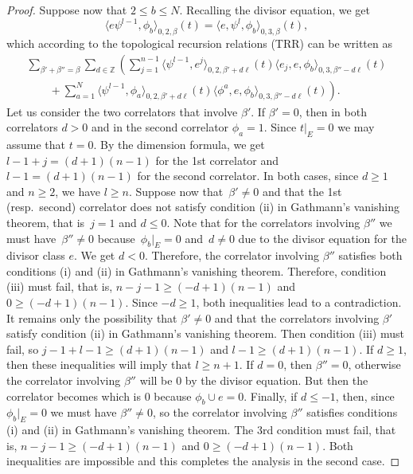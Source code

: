 \documentclass[pdftex]{sigma}
\numberwithin{equation}{section}
\newcommand{\ZZ}{\mathbb{Z}}
\begin{document}
\begin{proof}
Suppose now that $2\leq b\leq N$. Recalling the divisor equation, we get
\[
\big\langle e\psi^{l-1},\phi_b\big\rangle_{0,2,\beta}(t) =
\big\langle e,\psi^{l},\phi_b\big\rangle_{0,3,\beta}(t),
\]
which according to the topological recursion relations (TRR) can be written as
\begin{gather*}
\sum_{\beta'+\beta''=\beta} \sum_{d\in \ZZ} \left(
\sum_{j=1}^{n-1}
\big\langle \psi^{l-1},e^j\big\rangle_{0,2,\beta'+d\ell}(t)
\langle e_j, e,\phi_b\rangle_{0,3,\beta''-d\ell}(t)\right. \\
\left.\qquad+
\sum_{a=1}^{N}
\big\langle \psi^{l-1},\phi_a\big\rangle_{0,2,\beta'+d\ell}(t)
\langle \phi^a, e,\phi_b\rangle_{0,3,\beta''-d\ell}(t)
\right).
\end{gather*}
Let us consider the two correlators that involve $\beta'$. If
$\beta'=0$, then in both correlators $d>0$ and in the second
correlator $\phi_a=1$. Since $t|_E=0$ we may assume that $t=0$. By the
dimension formula, we get $l-1+j=(d+1)(n-1)$ for the 1st correlator and
$l-1=(d+1)(n-1)$ for the second correlator. In both cases, since
$d\geq 1$ and $n\geq 2$, we have $l\geq n$. Suppose now that~$\beta'\neq 0$ and that the 1st (resp.\ second) correlator does not
satisfy condition (ii) in Gathmann's vanishing theorem, that is~$j=1$
and $d\leq 0$. Note that for the correlators involving $\beta''$ we
must have~$\beta''\neq 0$ because~${\phi_b}|_{E}=0$ and~$d\neq 0$ due
to the divisor equation for the divisor class $e$. We get $d<0$. Therefore, the correlator involving $\beta''$ satisfies both conditions (i) and (ii) in Gathmann's vanishing theorem. Therefore, condition (iii) must fail, that is, $n-j-1\geq (-d+1)(n-1)$ and $0\geq (-d+1)(n-1)$. Since $-d\geq 1$, both inequalities lead to a contradiction. It remains only the possibility that $\beta'\neq 0$ and that the correlators involving $\beta'$ satisfy condition (ii) in Gathmann's vanishing theorem. Then condition (iii) must fail, so
$j-1+l-1\geq (d+1)(n-1)$ and $l-1\geq (d+1)(n-1)$. If $d\geq 1$, then these inequalities will imply that $l\geq n+1$. If $d=0$, then $\beta''=0$, otherwise the correlator involving $\beta''$ will be $0$ by the divisor equation. But then the correlator becomes  which is $0$ because $\phi_b\cup e=0$. Finally, if $d\leq -1$, then, since $\phi_b|_{E}=0$ we must have $\beta''\neq 0$, so the correlator involving $\beta''$ satisfies conditions (i) and (ii) in Gathmann's vanishing theorem. The 3rd condition must fail, that is, $n-j-1\geq (-d+1)(n-1)$ and $0\geq (-d+1)(n-1)$. Both inequalities are impossible and this completes the analysis in the second case.


\end{proof}
\end{document}
